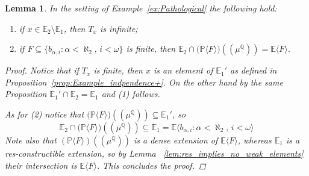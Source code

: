 \documentclass{amsart}
\newtheorem{lemma}[theorem]{Lemma}
\theoremstyle{remark}
\theoremstyle{definition}
\theoremstyle{plain}
\newcommand{\bE}{\mathbb E}
\newcommand{\bP}{\mathbb P}
\newcommand{\bQ}{\mathbb Q}
\newcommand{\Lhp}{(\!(}
\newcommand{\Rhp}{)\!)}
\theoremstyle{plain}
\begin{document}
\begin{lemma}\label{lem:finite_ok}
    In the setting of Example~\ref{ex:Pathological} the following hold:
    \begin{enumerate}
        \item if $x \in \bE_2 \setminus \bE_1$, then $T_x$ is infinite;
        \item if $F\subseteq \{b_{\alpha, i}: \alpha <\aleph_2,\, i<\omega\}$ is finite, then $\bE_2 \cap \big(\bP \langle F \rangle\big) \Lhp \mu^\bQ \Rhp= \bE \langle F\rangle$.
    \end{enumerate}
    \begin{proof}
        Notice that if $T_x$ is finite, then $x$ is an element of $\bE_1'$ as defined in Proposition~\ref{prop:Example_indpendence+}.
        On the other hand by the same Proposition $\bE_1' \cap \bE_2 = \bE_1$ and (1) follows.

        As for (2) notice that $\big(\bP \langle F \rangle\big) \Lhp \mu^\bQ \Rhp \subseteq \bE_1'$, so 
        \[\bE_2 \cap \big(\bP \langle F \rangle\big) \Lhp \mu^\bQ \Rhp \subseteq \bE_1 = \bE \langle b_{\alpha, i}: \alpha < \aleph_2,\, i<\omega\rangle\]
        Note also that $(\bP\langle F \rangle)\Lhp \mu^\bQ \Rhp$ is a dense extension of $\bE\langle F \rangle$, whereas $\bE_1$ is a res-constructible extension, so by Lemma ~\ref{lem:res_implies_no_weak_elements} their intersection is $\bE\langle F \rangle$. This concludes the proof.
    \end{proof}
\end{lemma}
\end{document}
